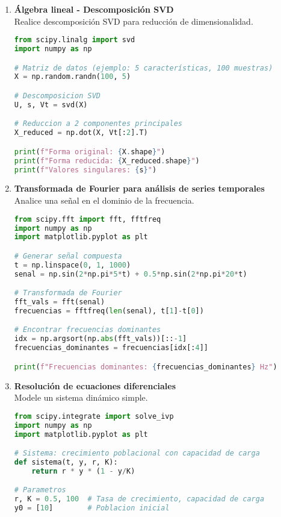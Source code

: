 \documentclass[12pt,a4paper]{article}
\begin{document}
\begin{enumerate}[label=\textbf{Ejercicio \arabic*:}, leftmargin=1.5cm]
\item \textbf{Álgebra lineal - Descomposición SVD} \\
Realice descomposición SVD para reducción de dimensionalidad.

\begin{lstlisting}[language=Python]
from scipy.linalg import svd
import numpy as np

# Matriz de datos (ejemplo: 5 características, 100 muestras)
X = np.random.randn(100, 5)

# Descomposicion SVD
U, s, Vt = svd(X)

# Reduccion a 2 componentes principales
X_reduced = np.dot(X, Vt[:2].T)

print(f"Forma original: {X.shape}")
print(f"Forma reducida: {X_reduced.shape}")
print(f"Valores singulares: {s}")
\end{lstlisting}

\item \textbf{Transformada de Fourier para análisis de series temporales} \\
Analice una señal en el dominio de la frecuencia.

\begin{lstlisting}[language=Python]
from scipy.fft import fft, fftfreq
import numpy as np
import matplotlib.pyplot as plt

# Generar señal compuesta
t = np.linspace(0, 1, 1000)
senal = np.sin(2*np.pi*5*t) + 0.5*np.sin(2*np.pi*20*t)

# Transformada de Fourier
fft_vals = fft(senal)
frecuencias = fftfreq(len(senal), t[1]-t[0])

# Encontrar frecuencias dominantes
idx = np.argsort(np.abs(fft_vals))[::-1]
frecuencias_dominantes = frecuencias[idx[:4]]

print(f"Frecuencias dominantes: {frecuencias_dominantes} Hz")
\end{lstlisting}

\item \textbf{Resolución de ecuaciones diferenciales} \\
Modele un sistema dinámico simple.

\begin{lstlisting}[language=Python]
from scipy.integrate import solve_ivp
import numpy as np
import matplotlib.pyplot as plt

# Sistema: crecimiento poblacional con capacidad de carga
def sistema(t, y, r, K):
    return r * y * (1 - y/K)

# Parametros
r, K = 0.5, 100  # Tasa de crecimiento, capacidad de carga
y0 = [10]        # Poblacion inicial


\end{lstlisting}
\end{enumerate}
\end{document}
